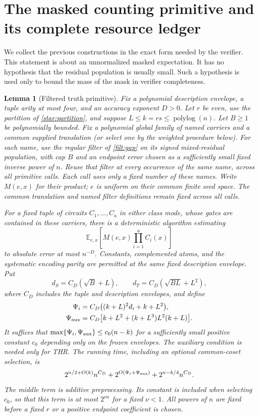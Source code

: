 \documentclass[11pt,letterpaper]{article}
\newtheorem{lemma}[theorem]{Lemma}
\theoremstyle{definition}
\theoremstyle{remark}
\newcommand{\E}{\mathbb E}
\newcommand{\polylog}{\operatorname{polylog}}
\begin{document}
\section{The masked counting primitive and its complete resource ledger}
\label{prim:appendix}

We collect the previous constructions in the exact form needed by the
verifier. This statement is about an unnormalized masked expectation.
It has no hypothesis that the residual population is usually small.
Such a hypothesis is used only to bound the mass of the mask in
verifier completeness.

\begin{lemma}[Filtered truth primitive]
\label{lem:primitive}
Fix a polynomial description envelope, a tuple arity at most four, and an
accuracy exponent $D>0$. Let $r$ be even, use the partition of
\cref{star:partition}, and suppose $L\le k=rs\le\polylog(n)$.
Let $B\ge1$ be polynomially bounded. Fix a polynomial global family of
named carriers and a common supplied translation (or select one by the
weighted procedure below). For each name, use the regular filter of
\cref{filt:gap} on its signed
mixed-residual population, with cap $B$ and an endpoint error chosen
as a sufficiently small fixed inverse power of $n$. Reuse that filter
at every occurrence of the same name, across all primitive calls.
Each call uses only a fixed number of these names. Write $M(e,x)$ for
their product; $e$ is uniform on their common finite seed space.
The common translation and named filter definitions remain fixed
across all calls.

For a fixed tuple of circuits $C_1,\ldots,C_a$ in either class mode,
whose gates are contained in these carriers, there is a deterministic
algorithm estimating
\begin{equation}
\E_{e,x}\left[M(e,x)\prod_{i=1}^a C_i(x)\right]
\label{prim:truth}
\end{equation}
to absolute error at most $n^{-D}$. Constants, complemented atoms,
and the systematic encoding parity are permitted at the same fixed
description envelope. Put
\[
d_S=C_D(\sqrt B+L),\qquad d_T=C_D(\sqrt{BL}+L^2),
\]
where $C_D$ includes the tuple and description envelopes, and define
\begin{align}
\Psi_i&=C_D\bigl((k+L)^2d_i+k+L^2\bigr),\label{prim:main-load}\\
\Psi_{\rm aux}&=C_D\bigl[k+L^2+(k+L^3)L^2(k+L)\bigr].
\label{prim:aux-load}
\end{align}
It suffices that $\max\{\Psi_i,\Psi_{\rm aux}\}\le c_0(n-k)$
for a sufficiently small positive constant $c_0$ depending only on the
frozen envelopes. The auxiliary condition is needed only for THR.
The running time, including an optional common-coset selection, is
\begin{equation}
2^{n/2+O(k)}n^{C_D}
+2^{O(\Psi_i+\Psi_{\rm aux})}
+2^{n-k/4}n^{C_D}.
\label{prim:runtime}
\end{equation}
The middle term is additive preprocessing. Its constant is included
when selecting $c_0$, so that this term is at most $2^{\nu n}$ for a
fixed $\nu<1$. All powers of $n$ are fixed before a fixed $r$ or a
positive endpoint coefficient is chosen.
\end{lemma}
\end{document}
